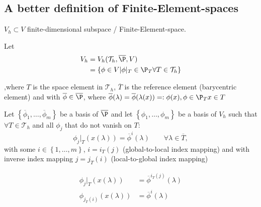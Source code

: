 \subsection{A better definition of Finite-Element-spaces}
\label{sec:A better definition of Finite-Element-spaces}

$V_{h} \subset V$ finite-dimensional subspace / Finite-Element-space.

Let 
\begin{align*}
	V_{h} &= V_{h}(\mathcal{T}_{h}, \overline{\P}, V) \\
		  &= \left\{  \phi \in V | \phi |_{T} \in \P_{T} \forall T \in \mathcal{T}_{h} \right\}  
\end{align*}

,where $T$ is the space element in $\mathcal{T}_{h}$, $\overline{T}$ is the reference element (barycentric %
	element) and with $\overline{\phi } \in \overline{\P}$, where $\overline{\phi }(\lambda ) = \overline{\phi }(\lambda (x)) =: \phi (x), \phi  \in \P_{T} x \in T$

Let $\left\{ \overline{\phi}_{1}, \ldots, \overline{\phi }_{m} \right\} $ be a basis of $\overline{\P}$ and let $\left\{ \phi _{1}, \ldots , \phi _{m} \right\}$ be a basis of $V_{h}$ such that $\forall T \in \mathcal{T}_{h}$ and all $\phi _{j}$ that do not vanish on $T$:
\[
	\phi _{j}|_{T}(x(\lambda )) = \overline{\phi }^{i}(\lambda ) \qquad \forall \lambda  \in \overline{T}
,\] 
with some $i \in \left\{ 1, \ldots, m \right\} $, $ i= i_{T}(j)$ (global-to-local index mapping) and with inverse index mapping $j=j_{T}(i)$ (local-to-global index mapping)

\begin{align*}
	\phi _{j}|_{T}(x(\lambda )) &= \overline{\phi }^{i_{T}(j)}(\lambda ) \\
	\phi _{j_{T}(i)}(x(\lambda )) &= \overline{\phi }^{i}(\lambda )
\end{align*}

